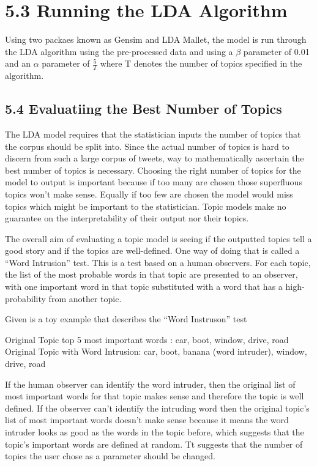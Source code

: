 \documentclass[
]{article}
\begin{document}
\hypertarget{running-the-lda-algorithm}{%
\section{5.3 Running the LDA
Algorithm}\label{running-the-lda-algorithm}}

Using two packaes known as Gensim and LDA Mallet, the model is run
through the LDA algorithm using the pre-processed data and using a
\(\beta\) parameter of 0.01 and an \(\alpha\) parameter of
\(\frac{5}{T}\) where T denotes the number of topics specified in the
algorithm.

\hypertarget{evaluatiing-the-best-number-of-topics}{%
\subsection{5.4 Evaluatiing the Best Number of
Topics}\label{evaluatiing-the-best-number-of-topics}}

The LDA model requires that the statistician inputs the number of topics
that the corpus should be split into. Since the actual number of topics
is hard to discern from such a large corpus of tweets, way to
mathematically ascertain the best number of topics is necessary.
Choosing the right number of topics for the model to output is important
because if too many are chosen those superfluous topics won't make
sense. Equally if too few are chosen the model would miss topics which
might be important to the statistician. Topic models make no guarantee
on the interpretability of their output nor their topics.

The overall aim of evaluating a topic model is seeing if the outputted
topics tell a good story and if the topics are well-defined. One way of
doing that is called a ``Word Intrusion'' test. This is a test based on
a human observers. For each topic, the list of the most probable words
in that topic are presented to an observer, with one important word in
that topic substituted with a word that has a high-probability from
another topic.

Given is a toy example that describes the ``Word Instruson'' test

Original Topic top 5 most important words : car, boot, window, drive,
road Original Topic with Word Intrusion: car, boot, banana (word
intruder), window, drive, road

If the human observer can identify the word intruder, then the original
list of most important words for that topic makes sense and therefore
the topic is well defined. If the observer can't identify the intruding
word then the original topic's list of most important words doesn't make
sense because it means the word intruder looks as good as the words in
the topic before, which suggests that the topic's important words are
defined at random. Tt suggests that the number of topics the user chose
as a parameter should be changed.
\end{document}
